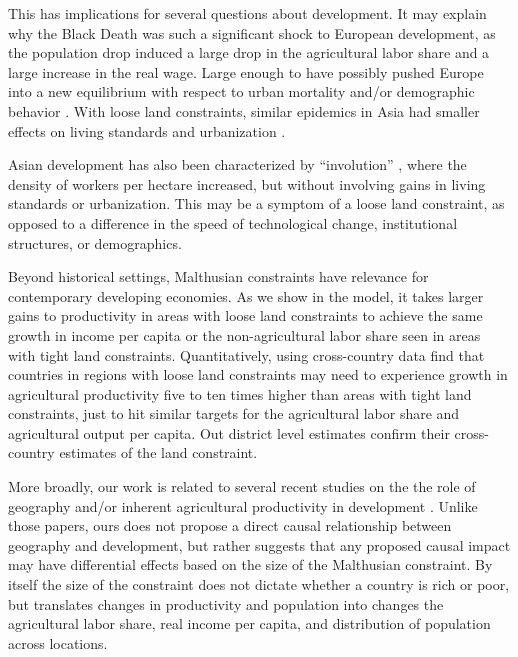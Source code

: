 \documentclass[11pt]{article}
\begin{document}
This has implications for several questions about development. It may explain why the Black Death was such a significant shock to European development, as the population drop induced a large drop in the agricultural labor share and a large increase in the real wage. Large enough to have possibly pushed Europe into a new equilibrium with respect to urban mortality and/or demographic behavior \citep{vv13,vv08}. With loose land constraints, similar epidemics in Asia had smaller effects on living standards and urbanization \citep{McNeill1976}.

Asian development has also been characterized by ``involution'' \citep{Geertz1963,Huang1990}, where the density of workers per hectare increased, but without involving gains in living standards or urbanization. This may be a symptom of a loose land constraint, as opposed to a difference in the speed of technological change, institutional structures, or demographics. 

Beyond historical settings, Malthusian constraints have relevance for contemporary developing economies. As we show in the model, it takes larger gains to productivity in areas with loose land constraints to achieve the same growth in income per capita or the non-agricultural labor share seen in areas with tight land constraints. Quantitatively, using cross-country data \citet{ev2016clim,ev2016} find that countries in regions with loose land constraints may need to experience growth in agricultural productivity five to ten times higher than areas with tight land constraints, just to hit similar targets for the agricultural labor share and agricultural output per capita. Out district level estimates confirm their cross-country estimates of the land constraint.

More broadly, our work is related to several recent studies on the the role of geography and/or inherent agricultural productivity in development \citep{oh2005,ashraf2010dynamics,Nunn2011,Nunn2012,mich2012,agn2013,cook2014role,cook14,fenske2014,alsan2015,ashrafmich2015,dks2015,galorozak2016,litina2016,ads2016,FrankemaPap2017}. Unlike those papers, ours does not propose a direct causal relationship between geography and development, but rather suggests that any proposed causal impact may have differential effects based on the size of the Malthusian constraint. By itself the size of the constraint does not dictate whether a country is rich or poor, but translates changes in productivity and population into changes the agricultural labor share, real income per capita, and distribution of population across locations.
\end{document}
